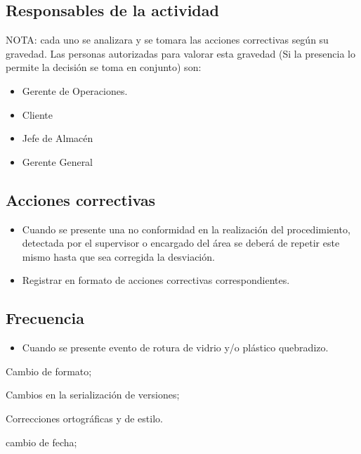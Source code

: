 \subsection{Responsables de la actividad}

NOTA: cada uno se analizara y se tomara las acciones correctivas según su gravedad. Las personas autorizadas para valorar esta gravedad (Si la presencia lo permite la decisión se toma en conjunto) son:

\begin{itemize}
	\item Gerente de Operaciones.
	\item Cliente
	\item Jefe de Almacén
	\item Gerente General
\end{itemize}

\subsection{Acciones correctivas}

\begin{itemize}
	\item Cuando se presente una no conformidad en la realización del procedimiento, detectada por el supervisor o encargado del área se deberá de repetir este mismo hasta que sea corregida la desviación.
	\item Registrar en formato de acciones correctivas correspondientes.
\end{itemize}

\subsection{Frecuencia}

\begin{itemize}
	\item Cuando se presente evento de rotura de vidrio y/o plástico quebradizo.
\end{itemize}

\begin{changelog}[simple, sectioncmd=\subsection*,label=changelog-\thesection-\MayorVer.\MenorVer]
	\begin{version}[v=\MayorVer.\MenorVer, date=2023--01, author=Pablo E. Alanis]
		\item Cambio de formato;
		\item Cambios en la serialización de versiones;
		\item Correcciones ortográficas y de estilo.
	\end{version}

	\begin{version}[v=1.7, date=2022--05, author=Alonso M.]
		\item cambio de fecha;
	\end{version}

\end{changelog}


